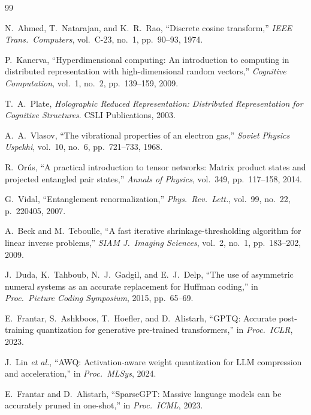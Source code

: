\documentclass[11pt,a4paper,openright]{book}
\begin{document}
\begin{thebibliography}{99}

	N.~Ahmed, T.~Natarajan, and K.~R.~Rao, ``Discrete cosine transform,''
	\emph{IEEE Trans.\ Computers}, vol.~C-23, no.~1, pp.~90--93, 1974.

	P.~Kanerva, ``Hyperdimensional computing: An introduction to computing in
	distributed representation with high-dimensional random vectors,''
	\emph{Cognitive Computation}, vol.~1, no.~2, pp.~139--159, 2009.

	T.~A.~Plate, \emph{Holographic Reduced Representation: Distributed
		Representation for Cognitive Structures}. CSLI Publications, 2003.

	A.~A.~Vlasov, ``The vibrational properties of an electron gas,''
	\emph{Soviet Physics Uspekhi}, vol.~10, no.~6, pp.~721--733, 1968.

	R.~Orús, ``A practical introduction to tensor networks: Matrix product
	states and projected entangled pair states,''
	\emph{Annals of Physics}, vol.~349, pp.~117--158, 2014.

	G.~Vidal, ``Entanglement renormalization,''
	\emph{Phys.\ Rev.\ Lett.}, vol.~99, no.~22, p.~220405, 2007.

	A.~Beck and M.~Teboulle, ``A fast iterative shrinkage-thresholding
	algorithm for linear inverse problems,''
	\emph{SIAM J.\ Imaging Sciences}, vol.~2, no.~1, pp.~183--202, 2009.

	J.~Duda, K.~Tahboub, N.~J.~Gadgil, and E.~J.~Delp, ``The use of asymmetric
	numeral systems as an accurate replacement for Huffman coding,''
	in \emph{Proc.\ Picture Coding Symposium}, 2015, pp.~65--69.

	E.~Frantar, S.~Ashkboos, T.~Hoefler, and D.~Alistarh, ``GPTQ: Accurate
	post-training quantization for generative pre-trained transformers,''
	in \emph{Proc.\ ICLR}, 2023.

	J.~Lin \emph{et al.}, ``AWQ: Activation-aware weight quantization for LLM
	compression and acceleration,''
	in \emph{Proc.\ MLSys}, 2024.

	E.~Frantar and D.~Alistarh, ``SparseGPT: Massive language models can be
	accurately pruned in one-shot,''
	in \emph{Proc.\ ICML}, 2023.


\end{thebibliography}
\end{document}
